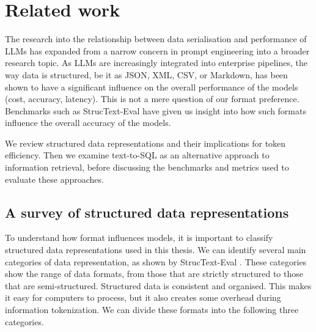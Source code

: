 \chapter{Related work} \label{ch:related_work}

The research into the relationship between data serialisation and performance of LLMs has expanded from a
narrow concern in prompt engineering into a broader research topic. As LLMs are increasingly integrated into
enterprise pipelines, the way data is structured, be it as JSON, XML, CSV, or Markdown, has been shown to
have a significant influence on the overall performance of the models (cost, accuracy, latency). This is not
a mere question of our format preference. Benchmarks such as StrucText-Eval \cite{struct-text-eval} have
given us insight into how such formats influence the overall accuracy of the models.

We review structured data representations and their implications for token efficiency. Then we examine
text-to-SQL as an alternative approach to information retrieval, before discussing the benchmarks and metrics
used to evaluate these approaches.

\section{A survey of structured data representations}

To understand how format influences models, it is important to classify structured data representations used
in this thesis. We can identify several main categories of data representation, as shown by StrucText-Eval
\cite{struct-text-eval}. These categories show the range of data formats, from those that are strictly
structured to those that are semi-structured. Structured data is consistent and organised. This makes it easy
for computers to process, but it also creates some overhead during information tokenization. We can divide
these formats into the following three categories.

